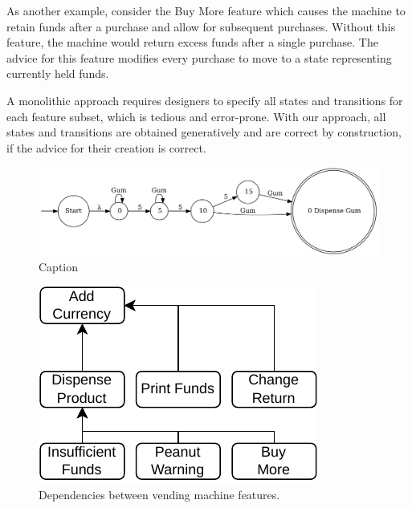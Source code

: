 \documentclass[sigplan,anonymous,review]{acmart}
\begin{document}
As another example, consider the Buy More feature which causes the machine to retain funds after a purchase and allow for subsequent purchases.  Without this feature, the machine would return excess funds after a single purchase.  The advice for this feature modifies every purchase to move to a state representing currently held funds.

A monolithic approach requires designers to specify all states and transitions for each feature subset, which is tedious and error-prone. With our approach, all states and transitions are obtained generatively and are correct by construction, if the advice for their creation is correct.


\begin{figure}
    \centering
    \includegraphics[width=\textwidth]{figures/vend1.pdf}
    \caption{Caption}
    \label{fig:label}
\end{figure}


\begin{figure}
    \centering
    \includegraphics[width=0.5\linewidth]{figures/VendingMachine.pdf}
    \caption{Dependencies between vending machine features.}
    \label{fig:vmDependencies}
\end{figure}
\end{document}

